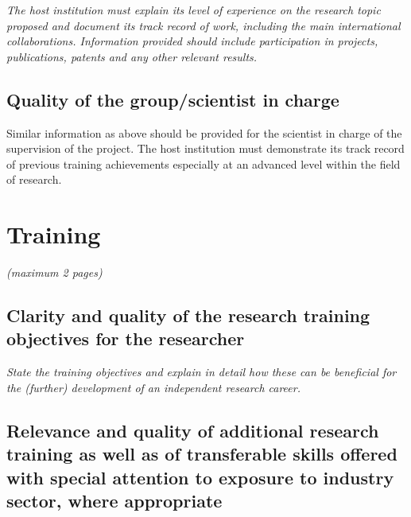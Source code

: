 \documentclass[a4paper,11pt]{article}
\newenvironment{xcomment}{\em}{}
\begin{document}
\begin{bibunit}
\begin{xcomment}
The host institution must explain its level of experience on the research topic proposed and
document its track record of work, including the main international collaborations. Information
provided should include participation in projects, publications, patents and any other relevant
results. 
\end{xcomment}


\subsection{Quality of the group/scientist in charge}

Similar information as above should be provided for the scientist in charge of the supervision of
the project. The host institution must demonstrate its track record of previous training
achievements especially at an advanced level within the field of research. 

\end{bibunit}

\newpage
\section{Training}

\begin{xcomment}
 (maximum 2 pages)
\end{xcomment}

\subsection{Clarity and quality of the research training objectives for the researcher}

\begin{xcomment}
 State the training objectives and explain in detail how these can be beneficial for the (further)
development of an independent research career.
\end{xcomment}

\subsection{Relevance and quality of additional research training as well as of transferable skills offered with special attention to exposure to industry sector, where appropriate}
\end{document}
